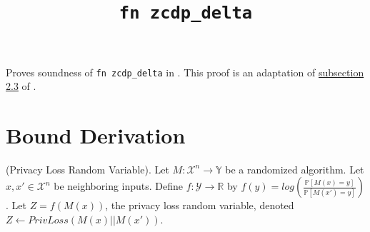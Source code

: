 \documentclass{article}
\title{\texttt{fn zcdp\_delta}}
\author{\MichaelShoemateAuthor}
\begin{document}
\maketitle

Proves soundness of \texttt{fn zcdp\_delta} in .
This proof is an adaptation of \href{https://arxiv.org/pdf/2004.00010.pdf#subsection.2.3}{subsection 2.3} of \cite{CKS20}.
\section{Bound Derivation}

\begin{definition}
\label{plrv}
(Privacy Loss Random Variable).
Let $M: \mathcal{X}^n \rightarrow \mathbb{Y}$ be a randomized algorithm.
Let $x, x' \in \mathcal{X}^n$ be neighboring inputs.
Define $f: \mathcal{Y} \rightarrow \mathbb{R}$ by $f(y) = log \left( \frac{\mathbb{P}[M(x)=y]}{\mathbb{P}[M(x')=y]} \right)$.
Let $Z = f(M(x))$, the privacy loss random variable, denoted $Z \leftarrow PrivLoss(M(x) || M(x'))$.
\end{definition}
\end{document}
